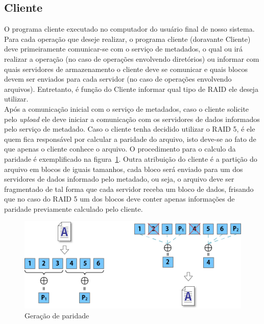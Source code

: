 	\subsection{Cliente}
	O programa cliente executado no computador do usuário final de nosso sistema. 
	\\
	
	Para cada operação que deseje realizar, o programa cliente (doravante Cliente) deve primeiramente comunicar-se com o serviço de metadados, o qual ou irá realizar a operação (no caso de operações envolvendo diretórios) ou informar com quais servidores de armazenamento o cliente deve se comunicar e quais blocos devem ser enviados para cada servidor (no caso de operações envolvendo arquivos). Entretanto, é função do Cliente informar qual tipo de RAID ele deseja utilizar.
	\\
	
	Após a comunicação inicial com o serviço de metadados, caso o cliente solicite pelo \textit{upload} ele deve iniciar a comunicação com os servidores de dados informados pelo serviço de metadado. Caso o cliente tenha decidido utilizar o RAID 5, é ele quem fica responsável por calcular a paridade do arquivo, isto deve-se ao fato de que apenas o cliente conhece o arquivo. O procedimento para o calculo da paridade é exemplificado na figura~\ref{fig:img6}. Outra atribuição do cliente é a partição do arquivo em blocos de iguais tamanhos, cada bloco será enviado para um dos servidores de dados informado pelo metadado, ou seja, o arquivo deve ser fragmentado de tal forma que cada servidor receba um bloco de dados, frisando que no caso do RAID 5 um dos blocos deve conter apenas informações de paridade previamente calculado pelo cliente. 
	\\
	
		\begin{figure}[htb]
			\begin{center}
				
				\includegraphics[clip,width=15.0cm]{images/image6.png}
				\caption{Geração de paridade}
				\label{fig:img6}
			\end{center}
		\end{figure}
	

